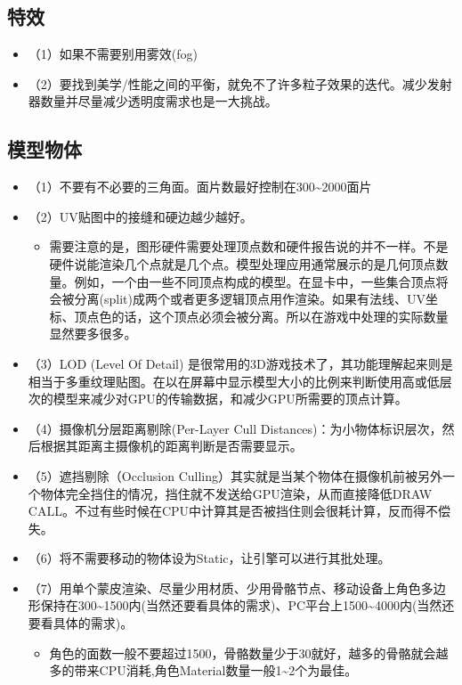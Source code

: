 \documentclass[9pt, b5paper]{article}
\begin{document}
\subsection{特效}
\label{sec:org4044ae9}
\begin{itemize}
\item （1）如果不需要别用雾效(fog)
\item （2）要找到美学/性能之间的平衡，就免不了许多粒子效果的迭代。减少发射器数量并尽量减少透明度需求也是一大挑战。
\end{itemize}
\subsection{模型物体}
\label{sec:org1bcb529}
\begin{itemize}
\item （1）不要有不必要的三角面。面片数最好控制在300\textasciitilde{}2000面片
\item （2）UV贴图中的接缝和硬边越少越好。
\begin{itemize}
\item 需要注意的是，图形硬件需要处理顶点数和硬件报告说的并不一样。不是硬件说能渲染几个点就是几个点。模型处理应用通常展示的是几何顶点数量。例如，一个由一些不同顶点构成的模型。在显卡中，一些集合顶点将会被分离(split)成两个或者更多逻辑顶点用作渲染。如果有法线、UV坐标、顶点色的话，这个顶点必须会被分离。所以在游戏中处理的实际数量显然要多很多。
\end{itemize}
\item （3）LOD (Level Of Detail) 是很常用的3D游戏技术了，其功能理解起来则是相当于多重纹理贴图。在以在屏幕中显示模型大小的比例来判断使用高或低层次的模型来减少对GPU的传输数据，和减少GPU所需要的顶点计算。
\item （4）摄像机分层距离剔除(Per-Layer Cull Distances)：为小物体标识层次，然后根据其距离主摄像机的距离判断是否需要显示。
\item （5）遮挡剔除（Occlusion Culling）其实就是当某个物体在摄像机前被另外一个物体完全挡住的情况，挡住就不发送给GPU渲染，从而直接降低DRAW CALL。不过有些时候在CPU中计算其是否被挡住则会很耗计算，反而得不偿失。
\item （6）将不需要移动的物体设为Static，让引擎可以进行其批处理。
\item （7）用单个蒙皮渲染、尽量少用材质、少用骨骼节点、移动设备上角色多边形保持在300\textasciitilde{}1500内(当然还要看具体的需求)、PC平台上1500\textasciitilde{}4000内(当然还要看具体的需求)。
\begin{itemize}
\item 角色的面数一般不要超过1500，骨骼数量少于30就好，越多的骨骼就会越多的带来CPU消耗,角色Material数量一般1\textasciitilde{}2个为最佳。

\end{itemize}
\end{itemize}
\end{document}
